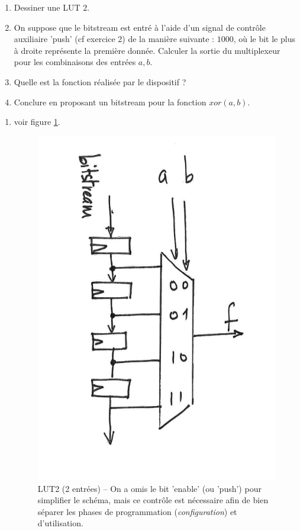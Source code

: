 \documentclass[a4paper,11pt]{article}
\begin{document}
\begin{enumerate}
  \item Dessiner une LUT 2.
  \item On suppose que le bitstream est entré à l'aide d'un signal de contrôle auxiliaire 'push' (cf exercice 2) de la manière suivante : $1000$, où le bit le plus à droite représente la première
  donnée. Calculer la sortie du multiplexeur pour les combinaisons des entrées $a,b$.
  \item Quelle est la fonction réalisée par le dispositif ?
  \item Conclure en proposant un bitstream pour la fonction $xor(a,b)$.
\end{enumerate}


\begin{enumerate}
  \item voir figure \ref{lut}.
  \begin{figure}[htb]
    \centering
    \includegraphics[scale=0.2]{lut.png}
    \caption{LUT2 (2 entrées) -- On a omis le bit 'enable' (ou 'push') pour simplifier le schéma, mais ce contrôle est nécessaire afin de bien séparer les phases
    de programmation ({\it configuration}) et d'utilisation.}
    \label{lut}
  \end{figure}


\end{enumerate}
\end{document}
